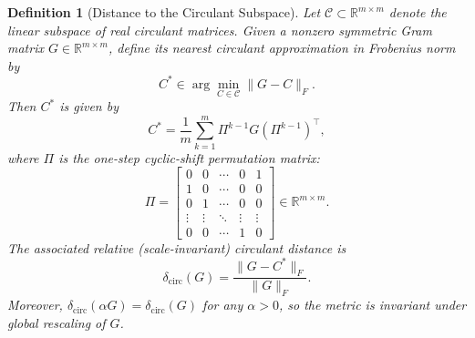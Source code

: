 \documentclass[11pt]{article}
\newtheorem{definition}{Definition}
\begin{document}
\begin{definition}[Distance to the Circulant Subspace]\label{def:circ-distance}
Let \(\mathcal{C}\subset\mathbb{R}^{m\times m}\) denote the linear subspace of real circulant matrices.
Given a nonzero symmetric Gram matrix \(G\in\mathbb{R}^{m\times m}\), define its nearest circulant approximation in Frobenius norm by
\[
C^*  \in  \arg\min_{C\in\mathcal{C}}  \| G-C \|_F   .
\]
Then \( C^* \) is given by
\[
C^*  =  \frac{1}{m}\sum_{k=1}^{m}\Pi^{k-1} G (\Pi^{k-1})^{ \top},
\]
where \(\Pi\) is the one-step cyclic-shift permutation matrix:
\[
\Pi=\begin{bmatrix}
0 & 0 & \cdots & 0 & 1\\
1 & 0 & \cdots & 0 & 0\\
0 & 1 & \cdots & 0 & 0\\
\vdots & \vdots & \ddots & \vdots & \vdots\\
0 & 0 & \cdots & 1 & 0
\end{bmatrix}
 \in \mathbb{R}^{m\times m}.
\]
The associated relative (scale-invariant) circulant distance is
\[
\delta_{\mathrm{circ}}(G)  =  \frac{\| G-C^* \|_F}{\| G \|_F}  .
\]
Moreover, \(\delta_{\mathrm{circ}}(\alpha G)=\delta_{\mathrm{circ}}(G)\) for any \(\alpha>0\),
so the metric is invariant under global rescaling of \(G\).
\end{definition}
\end{document}
